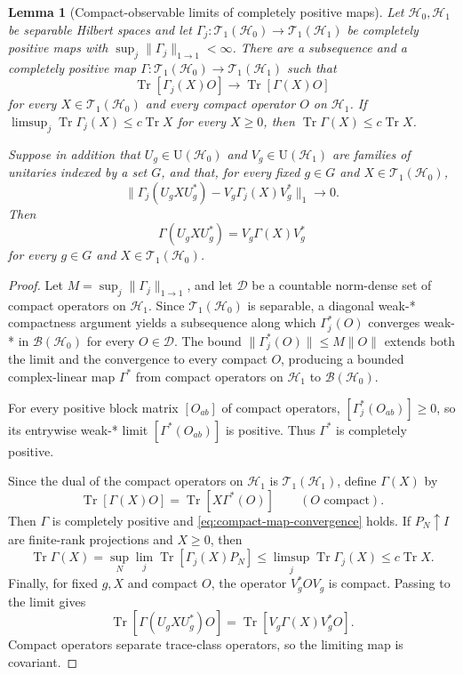 \documentclass[11pt]{article}
\newtheorem{lemma}[lemma]{Lemma}
\theoremstyle{remark}
\theoremstyle{plain}
\newcommand{\cH}{\mathcal H}
\newcommand{\cT}{\mathcal T}
\newcommand{\U}{\mathrm U}
\newcommand{\Tr}{\operatorname{Tr}}
\begin{document}
\begin{lemma}[Compact-observable limits of completely positive maps]
\label{lem:compact-cp-limit}
Let \(\cH_0,\cH_1\) be separable Hilbert spaces and let
\(\Gamma_j:\cT_1(\cH_0)\to\cT_1(\cH_1)\) be completely positive maps with
\(\sup_j\|\Gamma_j\|_{1\to1}<\infty\).  There are a subsequence and a
completely positive map
\(\Gamma:\cT_1(\cH_0)\to\cT_1(\cH_1)\) such that
\begin{equation}\label{eq:compact-map-convergence}
  \Tr[\Gamma_j(X)O]\longrightarrow\Tr[\Gamma(X)O]
\end{equation}
for every \(X\in\cT_1(\cH_0)\) and every compact operator
\(O\) on \(\cH_1\).  If
\(\limsup_j\Tr\Gamma_j(X)\le c\Tr X\) for every \(X\ge0\), then
\(\Tr\Gamma(X)\le c\Tr X\).

Suppose in addition that
\(U_g\in\U(\cH_0)\) and \(V_g\in\U(\cH_1)\) are families of
unitaries indexed by a set \(G\), and that, for every fixed \(g\in G\) and
\(X\in\cT_1(\cH_0)\),
\[
  \|\Gamma_j(U_g X U_g^*)-V_g\Gamma_j(X)V_g^*\|_1
  \longrightarrow0.
\]
Then
\begin{equation}\label{eq:compact-limit-covariance}
  \Gamma(U_g X U_g^*)=V_g\Gamma(X)V_g^*
\end{equation}
for every \(g\in G\) and \(X\in\cT_1(\cH_0)\).
\end{lemma}

\begin{proof}
Let \(M=\sup_j\|\Gamma_j\|_{1\to1}\), and let
\(\mathcal D\) be a countable norm-dense set of compact operators on
\(\cH_1\).
Since \(\cT_1(\cH_0)\) is separable, a diagonal weak-*
compactness argument yields a subsequence along which
\(\Gamma_j^*(O)\) converges weak-* in \(\mathcal B(\cH_0)\) for every
\(O\in\mathcal D\).  The bound
\(\|\Gamma_j^*(O)\|\le M\|O\|\) extends both the limit and the convergence
to every compact \(O\), producing a bounded complex-linear map
\(\Gamma^*\) from compact operators on \(\cH_1\) to
\(\mathcal B(\cH_0)\).

For every positive block matrix \([O_{ab}]\) of compact operators,
\([\Gamma_j^*(O_{ab})]\ge0\), so its entrywise weak-* limit
\([\Gamma^*(O_{ab})]\) is positive.  Thus \(\Gamma^*\) is completely positive.

Since the dual of the compact operators on \(\cH_1\) is
\(\cT_1(\cH_1)\), define \(\Gamma(X)\) by
\[
  \Tr[\Gamma(X)O]=\Tr[X\Gamma^*(O)]
  \qquad(O\text{ compact}).
\]
Then \(\Gamma\) is completely positive and
\eqref{eq:compact-map-convergence} holds.  If \(P_N\uparrow I\) are
finite-rank projections and \(X\ge0\), then
\[
  \Tr\Gamma(X)
  =\sup_N\lim_j\Tr[\Gamma_j(X)P_N]
  \le\limsup_j\Tr\Gamma_j(X)
  \le c\Tr X.
\]
Finally, for fixed \(g,X\) and compact \(O\), the operator
\(V_g^*OV_g\) is compact.  Passing to the limit gives
\[
  \Tr[\Gamma(U_gXU_g^*)O]
  =\Tr[V_g\Gamma(X)V_g^*O].
\]
Compact operators separate trace-class operators, so the limiting map is
covariant.
\end{proof}
\end{document}
